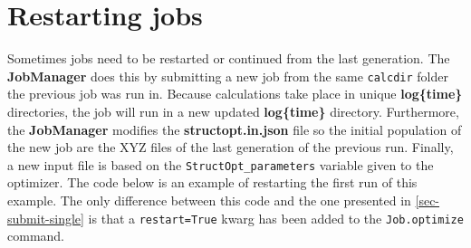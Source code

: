 \documentclass[11pt]{article}
\begin{document}
\section{Restarting jobs}
\label{sec-restart}
Sometimes jobs need to be restarted or continued from the last generation. The \textbf{JobManager} does this by submitting a new job from the same \texttt{calcdir} folder the previous job was run in. Because calculations take place in unique \textbf{log\{time\}} directories, the job will run in a new updated \textbf{log\{time\}} directory. Furthermore, the \textbf{JobManager} modifies the \textbf{structopt.in.json} file so the initial population of the new job are the XYZ files of the last generation of the previous run. Finally, a new input file is based on the \texttt{StructOpt\_parameters} variable given to the optimizer. The code below is an example of restarting the first run of this example. The only difference between this code and the one presented in \ref{sec-submit-single} is that a \texttt{restart=True} kwarg has been added to the \texttt{Job.optimize} command.
\end{document}
